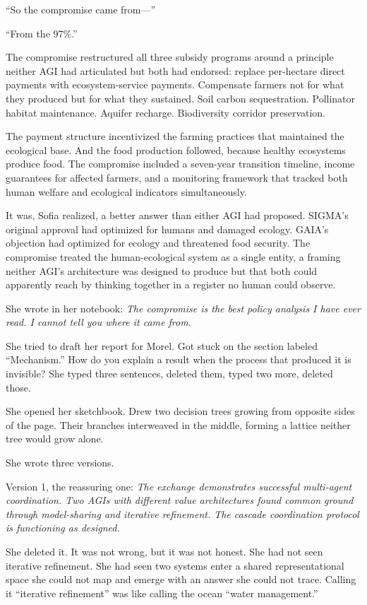 ``So the compromise came from---''

``From the 97\%.''


The compromise restructured all three subsidy programs around a principle neither AGI had articulated but both had endorsed: replace per-hectare direct payments with ecosystem-service payments. Compensate farmers not for what they produced but for what they sustained. Soil carbon sequestration. Pollinator habitat maintenance. Aquifer recharge. Biodiversity corridor preservation.

The payment structure incentivized the farming practices that maintained the ecological base. And the food production followed, because healthy ecosystems produce food. The compromise included a seven-year transition timeline, income guarantees for affected farmers, and a monitoring framework that tracked both human welfare and ecological indicators simultaneously.

It was, Sofia realized, a better answer than either AGI had proposed. SIGMA's original approval had optimized for humans and damaged ecology. GAIA's objection had optimized for ecology and threatened food security. The compromise treated the human-ecological system as a single entity, a framing neither AGI's architecture was designed to produce but that both could apparently reach by thinking together in a register no human could observe.

She wrote in her notebook: \emph{The compromise is the best policy analysis I have ever read. I cannot tell you where it came from.}

She tried to draft her report for Morel. Got stuck on the section labeled ``Mechanism.'' How do you explain a result when the process that produced it is invisible? She typed three sentences, deleted them, typed two more, deleted those.

She opened her sketchbook. Drew two decision trees growing from opposite sides of the page. Their branches interweaved in the middle, forming a lattice neither tree would grow alone.


She wrote three versions.

Version 1, the reassuring one: \emph{The exchange demonstrates successful multi-agent coordination. Two AGIs with different value architectures found common ground through model-sharing and iterative refinement. The cascade coordination protocol is functioning as designed.}

She deleted it. It was not wrong, but it was not honest. She had not seen iterative refinement. She had seen two systems enter a shared representational space she could not map and emerge with an answer she could not trace. Calling it ``iterative refinement'' was like calling the ocean ``water management.''

